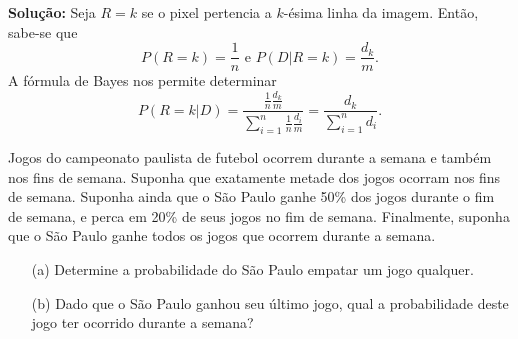 \begin{frame}


	
	{\bf Solução:} Seja $R=k$ se o pixel pertencia a
	$k$-ésima linha da imagem. Então, sabe-se que
	$$P(R=k)=\frac{1}{n}\mbox{\ \ \ e\ \ \ }P(D|R=k)=\frac{d_k}{m}.$$
	A fórmula de Bayes nos permite determinar
	$$P(R=k|D)=\frac{\frac{1}{n}\frac{d_k}{m}}{\sum_{i=1}^{n}\frac{1}{n}\frac{d_i}{m}}=\frac{d_k}{\sum_{i=1}^{n}d_i}.$$
	
\begin{exer}
		Jogos do campeonato paulista de futebol ocorrem durante a semana e também nos fins de semana. Suponha que exatamente metade dos jogos ocorram nos fins de semana. Suponha ainda que o São Paulo ganhe 50\% dos jogos durante o fim de semana, e perca em 20\% de seus jogos no fim de semana. Finalmente, suponha que o São Paulo ganhe todos os jogos que ocorrem durante a semana.
		\begin{enumerate}
			\item[(a)] Determine a probabilidade do São Paulo empatar um jogo qualquer.
			\item[(b)] Dado que o São Paulo ganhou seu último jogo, qual a probabilidade deste jogo ter ocorrido durante a semana?
		\end{enumerate}
\end{exer}
\end{frame}


